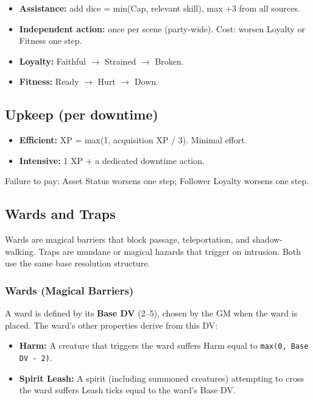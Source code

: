 \begin{itemize}
    \item \textbf{Assistance:} add dice = min(Cap, relevant skill), max +3 from
        all sources.
    \item \textbf{Independent action:} once per scene (party‑wide). Cost: worsen
        Loyalty or Fitness one step.
    \item \textbf{Loyalty:} Faithful $\rightarrow$ Strained $\rightarrow$ Broken.
    \item \textbf{Fitness:} Ready $\rightarrow$ Hurt $\rightarrow$ Down.
\end{itemize}

\subsection{Upkeep (per downtime)}
\begin{itemize}
    \item \textbf{Efficient:} XP = max(1, acquisition XP / 3). Minimal effort.
    \item \textbf{Intensive:} 1 XP + a dedicated downtime action.
\end{itemize}
Failure to pay: Asset Status worsens one step; Follower Loyalty worsens one step.

\subsection{Wards and Traps}

Wards are magical barriers that block passage, teleportation, and shadow-walking. Traps are mundane or magical hazards that trigger on intrusion. Both use the same base resolution structure.

\subsubsection{Wards (Magical Barriers)}

A ward is defined by its \textbf{Base DV} (2--5), chosen by the GM when the ward is placed. The ward's other properties derive from this DV:

\begin{itemize}
    \item \textbf{Harm:} A creature that triggers the ward suffers Harm equal to \texttt{max(0, Base DV - 2)}.
    \item \textbf{Spirit Leash:} A spirit (including summoned creatures) attempting to cross the ward suffers Leash ticks equal to the ward's Base DV.
\end{itemize}

